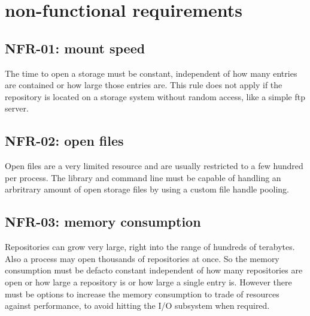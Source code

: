 \documentclass[9pt,pagesize,DIV12,normalheadings,BCOR5mm,headexclude,footexclude]{scrbook}
\begin{document}
\section{non-functional requirements}

\subsection{NFR-01: mount speed}
The time to open a storage must be constant, independent of how many entries
are contained or how large those entries are. This rule does not apply
if the repository is located on a storage system without random access,
like a simple ftp server.

\subsection{NFR-02: open files}
Open files are a very limited resource and are usually restricted to a few
hundred per process. The library and command line must be capable of handling
an arbritrary amount of open storage files by using a custom file handle 
pooling.

\subsection{NFR-03: memory consumption}
Repositories can grow very large, right into the range of hundreds of terabytes.
Also a process may open thousands of repositories at once. So the memory
consumption must be defacto constant independent of how many repositories are
open or how large a repository is or how large a single entry is. However 
there must be options to increase the memory consumption to trade of resources
against performance, to avoid hitting the I/O subsystem when required.




\end{document}
